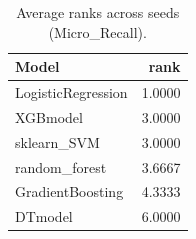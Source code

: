 \begin{table}[t]
\centering
\begin{tabular}{lr}
\toprule
Model & rank \\
\midrule
LogisticRegression & 1.0000 \\
XGBmodel & 3.0000 \\
sklearn_SVM & 3.0000 \\
random_forest & 3.6667 \\
GradientBoosting & 4.3333 \\
DTmodel & 6.0000 \\
\bottomrule
\end{tabular}
\caption{Average ranks across seeds (Micro_Recall).}
\label{tab:avg_rank_Micro_Recall}
\end{table}